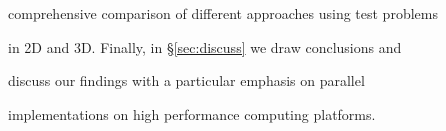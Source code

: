 \documentclass[smallcondensed,final]{svjour3}     %
\newcommand{\gsnote}[1]{\textcolor{blue}{GS: #1}}
\begin{document}
comprehensive comparison of different approaches using test problems

in 2D and 3D. Finally, in \S\ref{sec:discuss} we draw conclusions and

discuss our findings with a particular emphasis on parallel

implementations on high performance computing platforms.





























\end{document}
